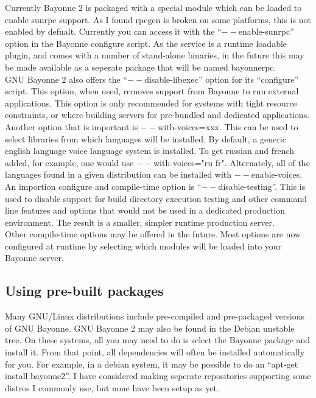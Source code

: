 \documentclass[a4paper,12pt]{article}
\begin{document}
Currently Bayonne 2 is packaged with a special module which can be
loaded to enable sunrpc support.  As I found rpcgen is broken on some
platforms, this is not enabled by defualt.  Currently you can access it
with the ``$--$enable-sunrpc'' option in the Bayonne configure script. 
As the service is a runtime loadable plugin, and comes with a number of
stand-alone binaries, in the future this may be made available as a
seperate package that will be named bayonnerpc. \\

GNU Bayonne 2 also offers the ``$--$disable-libexec'' option for its
``configure'' script.  This option, when used, removes support from
Bayonne to run external applications.  This option is only recommended
for systems with tight resource constraints, or where building servers
for pre-bundled and dedicated applications. \\

Another option that is important is $--$with-voices=xxx.  This can be
used to select libraries from which languages will be installed.  By
default, a generic english language voice language system is installed.
To get russian and french added, for example, one would use
$--$with-voices="ru fr".  Alternately, all of the languages found in a
given distribution can be installed with $--$enable-voices. \\

An importion configure and compile-time option is ``$--$disable-testing''.
This is used to disable support for build directory execution testing and
other command line features and options that would not be used in a
dedicated production environment.  The result is a smaller, simpler
runtime production server. \\

Other compile-time options may be offered in the future.  Most options are 
now configured at runtime by selecting which modules will be loaded into your 
Bayonne server.  \\

\subsection{Using pre-built packages}

Many GNU/Linux distributions include pre-compiled and pre-packaged
versions of GNU Bayonne.  GNU Bayonne 2 may also be found in the Debian   
unstable tree.  On these systems, all you may need to do is select the
Bayonne package and install it.  From that point, all dependencies will
often be installed automatically for you.  For example, in a debian
system, it may be possible to do an ``apt-get install bayonne2''.   I
have considered making seperate repositories supporting some distros I
commonly use, but none have been setup as yet. \\
\end{document}
